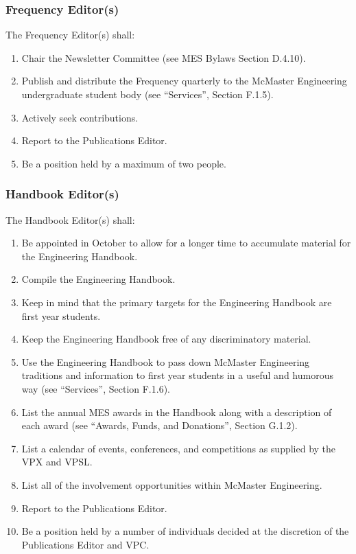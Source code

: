 \hypertarget{frequency-editors}{%
 \subsubsection{Frequency Editor(s)}
 \label{frequency-editors}}
The Frequency Editor(s) shall:

\begin{enumerate}
 \item
  Chair the Newsletter Committee (see MES Bylaws Section D.4.10).
 \item
  Publish and distribute the Frequency quarterly to the McMaster
  Engineering undergraduate student body (see ``Services'', Section
  F.1.5).
 \item
  Actively seek contributions.
 \item
  Report to the Publications Editor.
 \item
  Be a position held by a maximum of two people.

\end{enumerate}

\hypertarget{handbook-editors}{%
 \subsubsection{Handbook Editor(s)}
 \label{handbook-editors}}
The Handbook Editor(s) shall:

\begin{enumerate}
 \item
  Be appointed in October to allow for a longer time to accumulate
  material for the Engineering Handbook.
 \item
  Compile the Engineering Handbook.
 \item
  Keep in mind that the primary targets for the Engineering Handbook are
  first year students.
 \item
  Keep the Engineering Handbook free of any discriminatory material.
 \item
  Use the Engineering Handbook to pass down McMaster Engineering
  traditions and information to first year students in a useful and
  humorous way (see ``Services'', Section F.1.6).
 \item
  List the annual MES awards in the Handbook along with a description of
  each award (see ``Awards, Funds, and Donations'', Section G.1.2).
 \item
  List a calendar of events, conferences, and competitions as supplied
  by the VPX and VPSL.
 \item
  List all of the involvement opportunities within McMaster Engineering.
 \item
  Report to the Publications Editor.
 \item
  Be a position held by a number of individuals decided at the
  discretion of the Publications Editor and VPC.

\end{enumerate}

